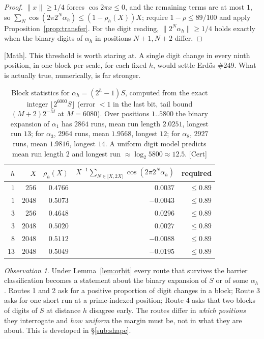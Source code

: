 \documentclass[11pt]{article}
\theoremstyle{plain}
\theoremstyle{definition}
\theoremstyle{remark}
\newtheorem{obs}[thm]{Observation}
\newcommand{\ev}[1]{{\small\textsf{[#1]}}\xspace}
\begin{document}
\begin{proof}
$\|x\|\ge 1/4$ forces $\cos 2\pi x\le 0$, and the remaining terms are at most
$1$, so $\sum_{N}\cos(2\pi 2^N\alpha_h)\le (1-\rho_h(X))X$; require
$1-\rho\le 89/100$ and apply Proposition~\ref{prop:transfer}. For the digit
reading, $\|2^N\alpha_h\|\ge 1/4$ holds exactly when the binary digits of
$\alpha_h$ in positions $N+1,N+2$ differ.
\end{proof}

\noindent
\ev{Math}. This threshold is worth staring at. A single digit change in
every ninth position, in one block per scale, for each fixed $h$, would
settle Erd\H{o}s \#249. What is actually true, numerically, is far stronger.

\begin{table}[h]\centering
\begin{tabular}{r r r r r}
\hline
$h$ & $X$ & $\rho_h(X)$ & $X^{-1}\sum_{N\in[X,2X)}\cos(2\pi 2^N\alpha_h)$ & required \\
\hline
$1$ & $256$  & $0.4766$ & $\phantom{-}0.0037$ & $\le 0.89$ \\
$1$ & $2048$ & $0.5073$ & $-0.0043$ & $\le 0.89$ \\
$3$ & $256$  & $0.4648$ & $\phantom{-}0.0296$ & $\le 0.89$ \\
$3$ & $2048$ & $0.5020$ & $\phantom{-}0.0027$ & $\le 0.89$ \\
$8$ & $2048$ & $0.5112$ & $-0.0088$ & $\le 0.89$ \\
$13$& $2048$ & $0.5049$ & $-0.0195$ & $\le 0.89$ \\
\hline
\end{tabular}
\caption{Block statistics for $\alpha_h=(2^h-1)S$, computed from the exact
integer $\lfloor 2^{6000}S\rfloor$ (error $<1$ in the last bit, tail bound
$(M+2)2^{-M}$ at $M=6080$). Over positions $1..5800$ the binary expansion of
$\alpha_1$ has $2864$ runs, mean run length $2.0251$, longest run $13$; for
$\alpha_3$, $2964$ runs, mean $1.9568$, longest $12$; for $\alpha_8$, $2927$
runs, mean $1.9816$, longest $14$. A uniform digit model predicts mean run
length $2$ and longest run $\approx\log_2 5800\approx 12.5$. \ev{Cert}}
\label{tab:blocks}
\end{table}

\begin{obs}\label{obs:allroutes}
Under Lemma~\ref{lem:orbit} every route that survives the barrier
classification becomes a statement about the binary expansion of $S$ or of
some $\alpha_h$. Routes 1 and 2 ask for a positive proportion of digit
changes in a block; Route 3 asks for one short run at a prime-indexed
position; Route 4 asks that two blocks of digits of $S$ at distance $h$
disagree early. The routes differ in \emph{which positions} they interrogate
and \emph{how uniform} the margin must be, not in what they are about. This
is developed in \S\ref{sub:shape}.
\end{obs}
\end{document}
